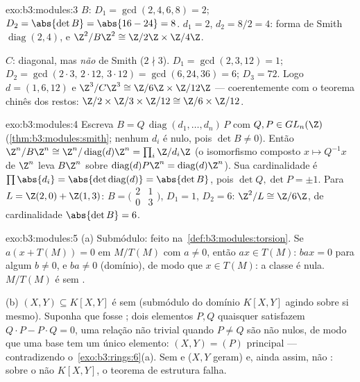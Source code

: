 \begin{solution}{exo:b3:modules:3}
$B$: $D_1 = \gcd(2,4,6,8) = 2$; $D_2 = \abs{\det B} = \abs{16 -
24} = 8$.  $d_1 = 2$, $d_2 = 8/2 = 4$: forma de Smith $\operatorname{diag}(2, 4)$,
e $\Z^2/B\Z^2 \cong \Z/2\Z
\times \Z/4\Z$.

$C$: diagonal, mas \emph{não} de Smith ($2 \nmid 3$). $D_1 =
\gcd(2,3,12) = 1$; $D_2 = \gcd(2\cdot3,\, 2\cdot12,\, 3\cdot12) =
\gcd(6, 24, 36) = 6$; $D_3 = 72$. Logo
$d = (1, 6, 12)$ e $\Z^3/C\Z^3 \cong \Z/6\Z\times\Z/12\Z$ --- coerentemente com o teorema chinês dos restos: $\Z/2\times\Z/3\times\Z/12 \cong \Z/6\times\Z/12$.
\end{solution}

\begin{solution}{exo:b3:modules:4}
Escreva $B = Q\,\operatorname{diag}(d_1, \dots, d_n)\,P$ com $Q, P
\in GL_n(\Z)$ (\cref{thm:b3:modules:smith}; nenhum $d_i$ é nulo, pois
$\det B \neq 0$). Então $\Z^n/B\Z^n \cong \Z^n/
\operatorname{diag}(d)\Z^n = \prod_i \Z/d_i\Z$ (o isomorfismo composto $x \mapsto Q^{-1}x$ de $\Z^n$ leva
$B\Z^n$ sobre $\operatorname{diag}(d)P\Z^n = \operatorname{diag}(d)\Z^n$). Sua cardinalidade é $\prod \abs{d_i} = \abs{\det
\operatorname{diag}(d)} = \abs{\det B}$, pois $\det Q, \det P = \pm
1$. Para $L = \Z(2,0) + \Z(1,3)$:
$B = \bigl(\begin{smallmatrix}2
& 1\\ 0 & 3\end{smallmatrix}\bigr)$, $D_1 = 1$, $D_2 = 6$: $\Z^2/L
\cong \Z/6\Z$, de cardinalidade $\abs{\det B} = 6$.
\end{solution}

\begin{solution}{exo:b3:modules:5}
(a) Submódulo: feito na~\cref{def:b3:modules:torsion}. Se $a(x +
T(M)) = 0$ em $M/T(M)$ com $a \neq 0$,
então $ax \in T(M)$: $bax
= 0$ para algum $b \neq 0$, e $ba \neq 0$ (domínio), de modo que $x \in
T(M)$: a
classe é nula. $M/T(M)$ é sem .

(b) $(X, Y) \subseteq K[X,Y]$ é sem  (submódulo do domínio $K[X,Y]$ agindo sobre si
mesmo). Suponha que fosse ; dois elementos $P, Q$ quaisquer
satisfazem $Q\cdot P - P \cdot Q = 0$, uma relação não trivial quando $P \ne Q$ são não nulos, de
modo que uma base tem um único elemento: $(X, Y) = (P)$ principal ---
contradizendo o~\cref{exo:b3:rings:6}(a). Sem  e 
($X, Y$ geram) e, ainda assim, não : sobre o não  $K[X,Y]$,
o teorema de estrutura falha.
\end{solution}

